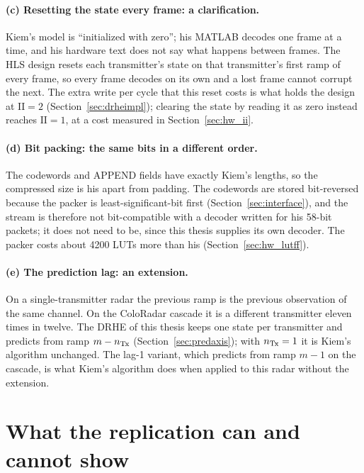 \paragraph{(c) Resetting the state every frame: a clarification.} Kiem's model
is ``initialized with zero''; his MATLAB decodes one frame at a time, and his
hardware text does not say what happens between frames. The HLS design resets
each transmitter's state on that transmitter's first ramp of every frame, so
every frame decodes on its own and a lost frame cannot corrupt the next. The
extra write per cycle that this reset costs is what holds the design at
$\mathrm{II} = 2$ (Section~\ref{sec:drheimpl}); clearing the state by reading it
as zero instead reaches $\mathrm{II} = 1$, at a cost measured in
Section~\ref{sec:hw_ii}.

\paragraph{(d) Bit packing: the same bits in a different order.} The codewords
and APPEND fields have exactly Kiem's lengths, so the compressed size is his
apart from padding. The codewords are stored bit-reversed because the packer is
least-significant-bit first (Section~\ref{sec:interface}), and the stream is
therefore not bit-compatible with a decoder written for his 58-bit packets; it
does not need to be, since this thesis supplies its own decoder. The packer
costs about \num{4200} LUTs more than his (Section~\ref{sec:hw_lutff}).

\paragraph{(e) The prediction lag: an extension.} On a single-transmitter radar
the previous ramp is the previous observation of the same channel. On the
ColoRadar cascade it is a different transmitter eleven times in twelve. The DRHE
of this thesis keeps one state per transmitter and predicts from ramp
$m - n_{\mathrm{Tx}}$ (Section~\ref{sec:predaxis}); with $n_{\mathrm{Tx}} = 1$ it is Kiem's algorithm
unchanged. The lag-1 variant, which predicts from ramp $m-1$ on the cascade, is
what Kiem's algorithm does when applied to this radar without the extension.

\section{What the replication can and cannot show}
\label{sec:kr_limits}

